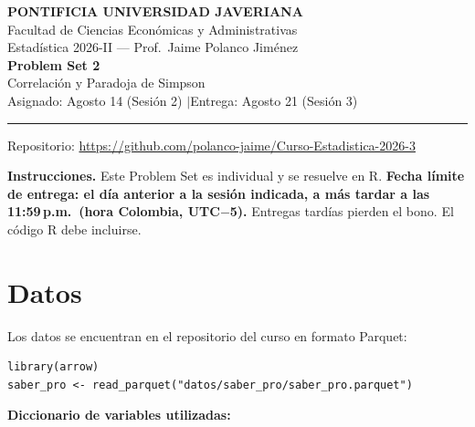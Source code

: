 \documentclass[11pt, a4paper]{article}
\begin{document}
\begin{center}
{\large\bfseries PONTIFICIA UNIVERSIDAD JAVERIANA}\\[3pt]
Facultad de Ciencias Econ\'omicas y Administrativas\\[2pt]
Estad\'istica 2026-II --- Prof.\ Jaime Polanco Jim\'enez\\[6pt]
{\LARGE\bfseries Problem Set 2}\\[3pt]
{\large Correlaci\'on y Paradoja de Simpson}\\[6pt]
Asignado: Agosto 14 (Sesi\'on 2) \quad$|$\quad Entrega: Agosto 21 (Sesi\'on 3)
\end{center}

\vspace{6pt}
\rule{\linewidth}{0.5pt}
\vspace{2pt}
{\centering\small Repositorio: \url{https://github.com/polanco-jaime/Curso-Estadistica-2026-3}\par}
\vspace{6pt}

\textbf{Instrucciones.} Este Problem Set es individual y se resuelve en R.
\textbf{Fecha l\'imite de entrega: el d\'ia anterior a la sesi\'on indicada, a m\'as tardar a las 11:59\,p.m.\ (hora Colombia, UTC$-$5).} Entregas tard\'ias pierden el bono. El c\'odigo R debe incluirse.

\section*{Datos}

Los datos se encuentran en el repositorio del curso en formato Parquet:

\begin{lstlisting}
library(arrow)
saber_pro <- read_parquet("datos/saber_pro/saber_pro.parquet")
\end{lstlisting}

\textbf{Diccionario de variables utilizadas:}
\end{document}
